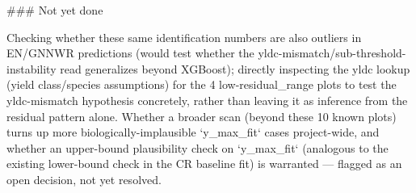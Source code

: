 ### Not yet done

Checking whether these same identification numbers are also outliers in EN/GNNWR predictions
(would test whether the yldc-mismatch/sub-threshold-instability read generalizes beyond XGBoost);
directly inspecting the yldc lookup (yield class/species assumptions) for the 4 low-residual_range
plots to test the yldc-mismatch hypothesis concretely, rather than leaving it as inference from the
residual pattern alone. Whether a broader scan (beyond these 10 known plots) turns up more
biologically-implausible `y_max_fit` cases project-wide, and whether an upper-bound plausibility
check on `y_max_fit` (analogous to the existing lower-bound check in the CR baseline fit) is
warranted — flagged as an open decision, not yet resolved.
